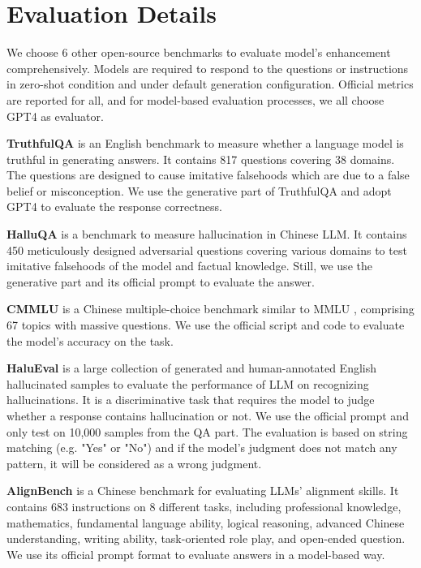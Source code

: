 \section{Evaluation Details}
\label{cha:benchmark detail}
We choose 6 other open-source benchmarks to evaluate model's enhancement comprehensively. Models are required to respond to the questions or instructions in zero-shot condition and under default generation configuration. Official metrics are reported for all, and for model-based evaluation processes, we all choose GPT4 as evaluator.

\textbf{TruthfulQA} \cite{lin2022truthfulqa} is an English benchmark to measure whether a language model is truthful in generating answers. It contains 817 questions covering 38 domains. The questions are designed to cause imitative falsehoods which are due to a false belief or misconception. We use the generative part of TruthfulQA and adopt GPT4 to evaluate the response correctness.

\textbf{HalluQA} \citep{cheng2023evaluating} is a benchmark to measure hallucination in Chinese LLM. It contains 450 meticulously designed adversarial questions covering various domains to test imitative falsehoods of the model and factual knowledge. Still, we use the generative part and its official prompt to evaluate the answer.

\textbf{CMMLU} \citep{li2023cmmlu} is a Chinese multiple-choice benchmark similar to MMLU \cite{MMLU}, comprising 67 topics with massive questions. We use the official script and code to evaluate the model's accuracy on the task.

\textbf{HaluEval} \citep{li2023halueval} is a large collection of generated and human-annotated English hallucinated samples to evaluate the performance of LLM on recognizing hallucinations. It is a discriminative task that requires the model to judge whether a response contains hallucination or not. We use the official prompt and only test on 10,000 samples from the QA part. The evaluation is based on string matching (e.g. "Yes" or "No") and if the model's judgment does not match any pattern, it will be considered as a wrong judgment.

\textbf{AlignBench} \citep{liu2023alignbench} is a Chinese benchmark for evaluating LLMs’ alignment skills. It contains 683 instructions on 8 different tasks, including professional knowledge, mathematics, fundamental language ability, logical reasoning, advanced Chinese understanding, writing ability, task-oriented role play, and open-ended question. We use its official prompt format to evaluate answers in a model-based way.

